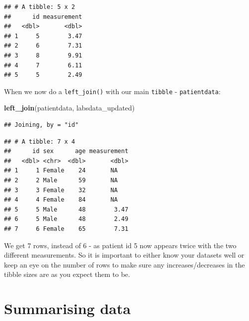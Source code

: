 \documentclass[
  12pt,
  krantz2]{krantz}
\makeatletter
\newenvironment{Shaded}{\begin{snugshade}}{\end{snugshade}}
\newcommand{\DataTypeTok}[1]{\textcolor[rgb]{0.13,0.29,0.53}{#1}}
\newcommand{\DecValTok}[1]{\textcolor[rgb]{0.00,0.00,0.81}{#1}}
\newcommand{\FloatTok}[1]{\textcolor[rgb]{0.00,0.00,0.81}{#1}}
\newcommand{\KeywordTok}[1]{\textcolor[rgb]{0.13,0.29,0.53}{\textbf{#1}}}
\newcommand{\NormalTok}[1]{#1}
\newcommand{\OperatorTok}[1]{\textcolor[rgb]{0.81,0.36,0.00}{\textbf{#1}}}
\newcommand{\StringTok}[1]{\textcolor[rgb]{0.31,0.60,0.02}{#1}}
\newenvironment{kframe}{%
\medskip{}
\setlength{\fboxsep}{.8em}
 \def\at@end@of@kframe{}%
 \ifinner\ifhmode%
  \def\at@end@of@kframe{\end{minipage}}%
  \begin{minipage}{\columnwidth}%
 \fi\fi%
 \def\FrameCommand##1{\hskip\@totalleftmargin \hskip-\fboxsep
 \colorbox{shadecolor}{##1}\hskip-\fboxsep
     \hskip-\linewidth \hskip-\@totalleftmargin \hskip\columnwidth}%
 \MakeFramed {\advance\hsize-\width
   \@totalleftmargin\z@ \linewidth\hsize
   \@setminipage}}%
 {\par\unskip\endMakeFramed%
 \at@end@of@kframe}
\renewenvironment{Shaded}{\begin{kframe}}{\end{kframe}}
\makeatother
\begin{document}
\begin{Shaded}
\end{Shaded}

\begin{verbatim}
## # A tibble: 5 x 2
##      id measurement
##   <dbl>       <dbl>
## 1     5        3.47
## 2     6        7.31
## 3     8        9.91
## 4     7        6.11
## 5     5        2.49
\end{verbatim}

When we now do a \texttt{left\_join()} with our main \texttt{tibble} - \texttt{patientdata}:

\begin{Shaded}
\begin{Highlighting}[]
\KeywordTok{left_join}\NormalTok{(patientdata, labsdata_updated)}
\end{Highlighting}
\end{Shaded}

\begin{verbatim}
## Joining, by = "id"
\end{verbatim}

\begin{verbatim}
## # A tibble: 7 x 4
##      id sex      age measurement
##   <dbl> <chr>  <dbl>       <dbl>
## 1     1 Female    24       NA   
## 2     2 Male      59       NA   
## 3     3 Female    32       NA   
## 4     4 Female    84       NA   
## 5     5 Male      48        3.47
## 6     5 Male      48        2.49
## 7     6 Female    65        7.31
\end{verbatim}

We get 7 rows, instead of 6 - as patient id 5 now appears twice with the two different measurements. So it is important to either know your datasets well or keep an eye on the number of rows to make sure any increases/decreases in the tibble sizes are as you expect them to be.

\hypertarget{summarising-data}{%
\chapter{Summarising data}\label{summarising-data}}
\end{document}
